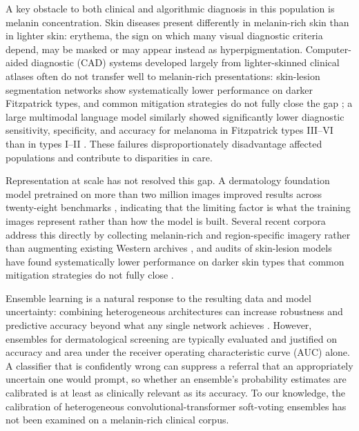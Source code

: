 \documentclass[VANCOUVER,twocolumn]{USG}
\begin{document}
A key obstacle to both clinical and algorithmic diagnosis in this
population is melanin concentration. Skin diseases present differently in
melanin-rich skin than in lighter skin: erythema, the sign on which many
visual diagnostic criteria depend, may be masked or may appear instead as
hyperpigmentation.
Computer-aided diagnostic (CAD) systems developed largely from
lighter-skinned clinical atlases often do not transfer well to melanin-rich
presentations: skin-lesion segmentation networks show systematically lower
performance on darker Fitzpatrick types, and common mitigation strategies
do not fully close the gap \cite{ref6}; a large multimodal language model
similarly showed significantly lower diagnostic sensitivity, specificity,
and accuracy for melanoma in Fitzpatrick types III--VI than in types I--II
\cite{ref10}. These failures disproportionately disadvantage affected
populations and contribute to disparities in care.

Representation at scale has not resolved this gap. A dermatology
foundation model pretrained on more than two million images improved
results across twenty-eight benchmarks \cite{ref2}, indicating that the
limiting factor is what the training images represent rather than how the
model is built. Several recent corpora address this directly by collecting
melanin-rich and region-specific imagery rather than augmenting existing
Western archives \cite{ref3,ref4,ref5}, and audits of skin-lesion models
have found systematically lower performance on darker skin types that
common mitigation strategies do not fully close \cite{ref6}.

Ensemble learning is a natural response to the resulting data and model
uncertainty: combining heterogeneous architectures can increase robustness
and predictive accuracy beyond what any single network achieves
\cite{ref14,ref15}. However, ensembles for dermatological screening are
typically evaluated and justified on accuracy and area under the receiver
operating characteristic curve (AUC) alone. A classifier that is
confidently wrong can suppress a referral that an appropriately uncertain
one would prompt, so whether an ensemble's probability estimates are
calibrated is at least as clinically relevant as its accuracy. To our
knowledge, the calibration of heterogeneous convolutional-transformer
soft-voting ensembles has not been examined on a melanin-rich clinical
corpus.
\end{document}

